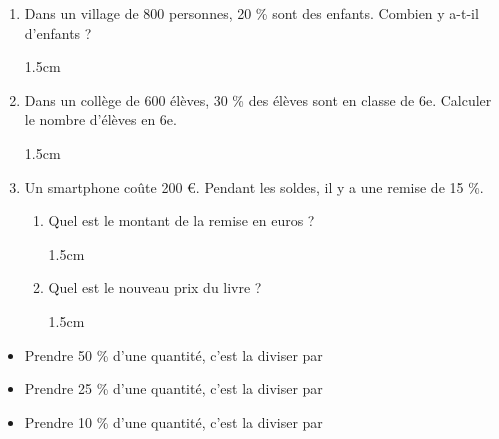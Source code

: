 \documentclass[a4paper]{book}
\begin{document}
    \begin{exemple}
        \begin{enumerate}[leftmargin=*]
            \item Dans un village de 800 personnes, 20 \% sont des enfants. Combien y a-t-il d'enfants ? 
            \begin{ZoneReponse}{1.5cm}
            \end{ZoneReponse}
            
            \item Dans un collège de 600 élèves, 30 \% des élèves sont en classe de 6e. Calculer le nombre d'élèves en 6e.
            \begin{ZoneReponse}{1.5cm}
            \end{ZoneReponse}

            \item Un smartphone coûte 200 €. Pendant les soldes, il y a une remise de 15 \%. 
            \begin{enumerate}[leftmargin=*]
                \item Quel est le montant de la remise en euros ?
                \begin{ZoneReponse}{1.5cm}
                \end{ZoneReponse}

                \item Quel est le nouveau prix du livre ?
                \begin{ZoneReponse}{1.5cm}
                \end{ZoneReponse}
            \end{enumerate}
        \end{enumerate}
    \end{exemple}
    

    \medskip


    \begin{propriete}
        \begin{itemize}
            \item Prendre 50 \% d'une quantité, c'est la diviser par \points[2]

            \medskip
            
            \item Prendre 25 \% d'une quantité, c'est la diviser par \points[2]

            \medskip
            
            \item Prendre 10 \% d'une quantité, c'est la diviser par \points[2]
        \end{itemize}
    \end{propriete}
\end{document}
